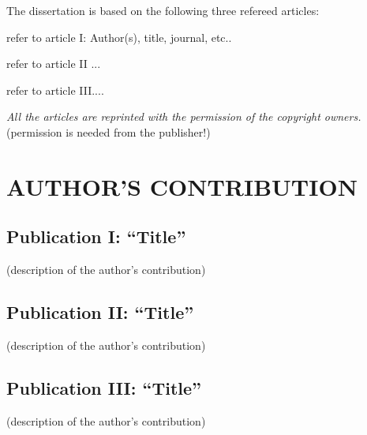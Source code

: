 \documentclass{article}
\begin{document}
\vspace*{3cm}

The dissertation is based on the following three refereed articles:

\begin{list}{}{} 
	\item[(I)] refer to article I: Author(s), title, journal,  etc..
	\item[(II)] refer to article II ...
	\item[(III)] refer to article III....
\end{list}

\vspace{1cm}

{\em All the articles are reprinted with the permission of the copyright owners.} (permission is needed from the publisher!)




\newpage


\section*{AUTHOR'S CONTRIBUTION}

\vspace*{3cm}

\subsection*{{\normalsize   \textbf{Publication I: \textquotedblleft Title\textquotedblright}}}  

(description of the author's contribution)

\subsection*{{\normalsize \textbf{Publication II: \textquotedblleft Title\textquotedblright}}}

(description of the author's contribution)

\subsection*{{\normalsize \textbf{Publication III: \textquotedblleft Title\textquotedblright}}}
(description of the author's contribution)
\end{document}
